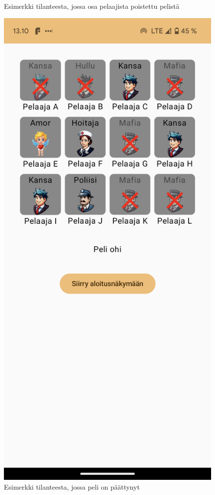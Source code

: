 \begin{figure}[h!]
\begin{minipage}[t]{.3\textwidth}
            \caption{Esimerkki tilanteesta, jossa osa pelaajista poistettu pelistä}
            \label{fig:screenshot-game-running}
      \end{minipage}
      \begin{minipage}[t]{.3\textwidth}
            \includegraphics[width=\textwidth]{figures/screenshot-game-over.png}
            \caption{Esimerkki tilanteesta, jossa peli on päättynyt}
            \label{fig:screenshot-game-over}
      \end{minipage}
\end{figure}

